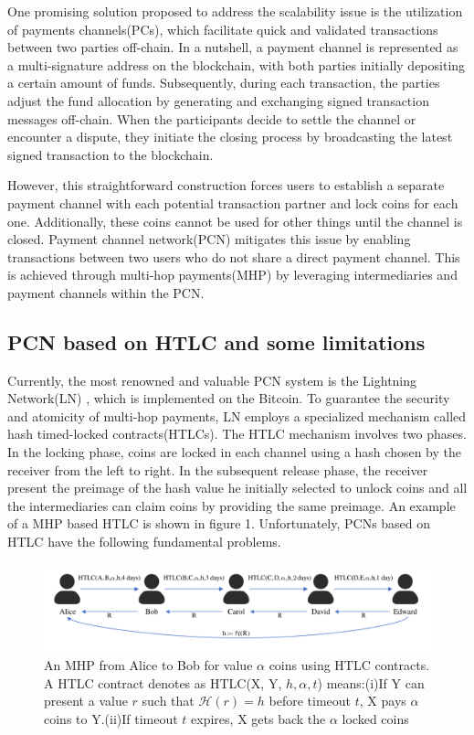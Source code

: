 \documentclass[conference]{IEEEtran}
\begin{document}
One promising solution proposed to address the scalability issue is the utilization of payments channels(PCs), 
which facilitate quick and validated transactions between two parties off-chain. In a nutshell, a payment 
channel is represented as a multi-signature address on the blockchain, with both parties initially depositing 
a certain amount of funds. Subsequently, during each transaction, the parties adjust the fund allocation by 
generating and exchanging signed transaction messages off-chain. When the participants decide to settle the 
channel or encounter a dispute, they initiate the closing process by broadcasting the latest signed transaction to the blockchain. 

However, this straightforward construction forces users to establish a separate payment channel with each
potential transaction partner and lock coins for each one. Additionally, these coins cannot be used for other 
things until the channel is closed. Payment channel network(PCN) mitigates this issue by enabling transactions 
between two users who do not share a direct payment channel. This is achieved through multi-hop payments(MHP) 
by leveraging intermediaries and payment channels within the PCN.

\subsection{PCN based on HTLC and some limitations}
Currently, the most renowned and valuable PCN system is the Lightning Network(LN) \cite{ln}, which is implemented on 
the Bitcoin. To guarantee the security and atomicity of multi-hop payments, LN employs a specialized mechanism 
called hash timed-locked contracts(HTLCs). The HTLC mechanism involves two phases. In the locking phase, coins 
are locked in each channel using a hash chosen by the receiver from the left to right. In the subsequent release 
phase, the receiver present the preimage of the hash value he initially selected to unlock coins and all the 
intermediaries can claim coins by providing the same preimage. An example of a MHP based HTLC is shown in figure 1. 
Unfortunately, PCNs based on HTLC have the following fundamental problems.

\begin{figure}[b]
	\centering
	\includegraphics[scale=0.35]{htlc.pdf}
	\caption{An MHP from Alice to Bob for value $\alpha$ coins using HTLC contracts. A HTLC contract denotes as 
		HTLC(X, Y, $h, \alpha, t$) means:(i)If Y can present a value $r$ such that $\mathcal{H}(r)=h$ before timeout $t$,
		X pays $\alpha$ coins to Y.(ii)If timeout $t$ expires, X gets back the $\alpha$ locked coins}
\end{figure}
\end{document}
